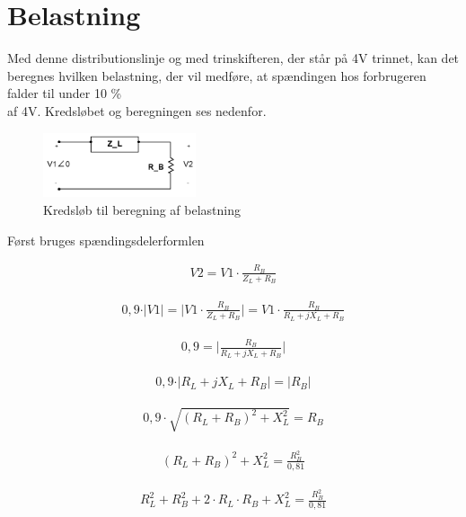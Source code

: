 
\section{Belastning}

Med denne distributionslinje og med trinskifteren, der står på 4V trinnet, kan det beregnes hvilken belastning, der vil medføre, at spændingen hos forbrugeren falder til under 10 \% \\ af 4V. Kredsløbet og beregningen ses nedenfor.

\begin{figure}[htbp] %
	\centering
	\includegraphics[width=0.4\textwidth]{Figure/Belastningberegning}
	\caption{Kredsløb til beregning af belastning}
	\label{fig:Belastningberegning}
\end{figure}

Først bruges spændingsdelerformlen

\begin{align}
	V2=V1\cdot\frac{R_B}{Z_L+R_B}
\end{align}

\begin{align}
	0,9\cdot\vert V1 \vert = \vert V1\cdot\frac{R_B}{Z_L+R_B} \vert = V1\cdot\frac{R_B}{R_L+jX_L+R_B}
\end{align}

\begin{align}
0,9= \vert \frac{R_B}{R_L+jX_L+R_B} \vert
\end{align}

\begin{align}
	0,9\cdot\vert R_L+jX_L+R_B \vert = \vert R_B \vert
\end{align}

\begin{align}
0,9\cdot\sqrt{(R_L+R_B)^2+X_L^2}=R_B
\end{align}

\begin{align}
(R_L+R_B)^2+X_L^2=\frac{R_B^2}{0,81}
\end{align}

\begin{align}
R_L^2+R_B^2+2\cdot R_L\cdot R_B+X_L^2=\frac{R_B^2}{0,81}
\end{align}

